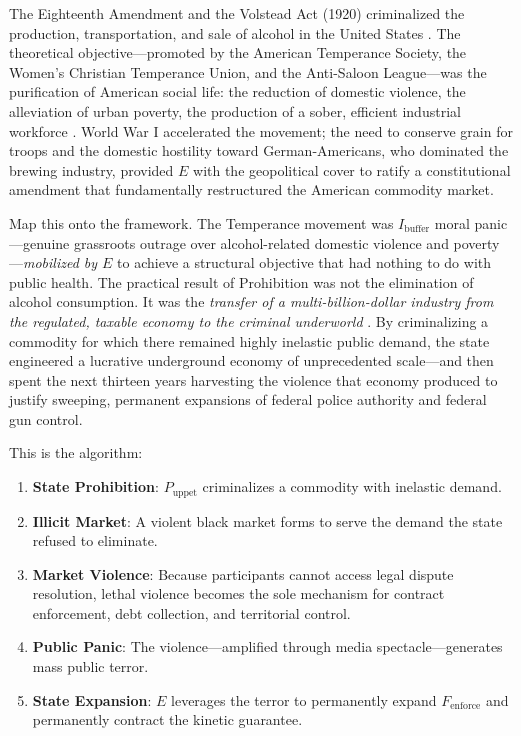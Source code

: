 \documentclass[12pt,openany]{book}
\begin{document}
The Eighteenth Amendment and the Volstead Act (1920) criminalized the production, transportation, and sale of alcohol in the United States \cite{cato_prohibition}. The theoretical objective---promoted by the American Temperance Society, the Women's Christian Temperance Union, and the Anti-Saloon League---was the purification of American social life: the reduction of domestic violence, the alleviation of urban poverty, the production of a sober, efficient industrial workforce \cite{pbs_prohibition}. World War I accelerated the movement; the need to conserve grain for troops and the domestic hostility toward German-Americans, who dominated the brewing industry, provided $E$ with the geopolitical cover to ratify a constitutional amendment that fundamentally restructured the American commodity market.

Map this onto the framework. The Temperance movement was $I_{\text{buffer}}$ moral panic---genuine grassroots outrage over alcohol-related domestic violence and poverty---\textit{mobilized by $E$} to achieve a structural objective that had nothing to do with public health. The practical result of Prohibition was not the elimination of alcohol consumption. It was the \textit{transfer of a multi-billion-dollar industry from the regulated, taxable economy to the criminal underworld} \cite{cato_prohibition}. By criminalizing a commodity for which there remained highly inelastic public demand, the state engineered a lucrative underground economy of unprecedented scale---and then spent the next thirteen years harvesting the violence that economy produced to justify sweeping, permanent expansions of federal police authority and federal gun control.

This is the algorithm:

\begin{enumerate}
    \item \textbf{State Prohibition}: $P_{\text{uppet}}$ criminalizes a commodity with inelastic demand.
    \item \textbf{Illicit Market}: A violent black market forms to serve the demand the state refused to eliminate.
    \item \textbf{Market Violence}: Because participants cannot access legal dispute resolution, lethal violence becomes the sole mechanism for contract enforcement, debt collection, and territorial control.
    \item \textbf{Public Panic}: The violence---amplified through media spectacle---generates mass public terror.
    \item \textbf{State Expansion}: $E$ leverages the terror to permanently expand $F_{\text{enforce}}$ and permanently contract the kinetic guarantee.
\end{enumerate}
\end{document}
